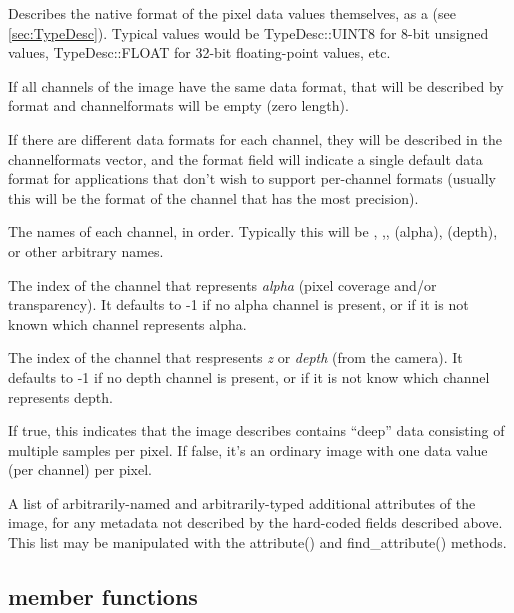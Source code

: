 Describes the native format of the pixel data values themselves, as a
\TypeDesc (see \ref{sec:TypeDesc}).  Typical values would be 
{\cf TypeDesc::UINT8} for 8-bit unsigned values, {\cf TypeDesc::FLOAT}
for 32-bit floating-point values, etc.

If all channels of the image have the same data format, that will
be described by {\cf format} and {\cf channelformats} will be empty
(zero length).

If there are different data formats for each channel, they will be
described in the {\cf channelformats} vector, and the {\cf format} field
will indicate a single default data format for applications that don't
wish to support per-channel formats (usually this will be the format
of the channel that has the most precision).
\apiend

The names of each channel, in order.  Typically this will be ,
,,  (alpha),  (depth), or other arbitrary
names.
\apiend

The index of the channel that represents \emph{alpha} (pixel coverage
and/or transparency).  It defaults to -1 if no alpha channel is present,
or if it is not known which channel represents alpha.
\apiend

The index of the channel that respresents \emph{z} or \emph{depth} (from
the camera).  It defaults to -1 if no depth channel is present, or if it
is not know which channel represents depth.
\apiend

If {\cf true}, this indicates that the image describes contains ``deep''
data consisting of multiple samples per pixel.  If {\cf false}, it's an
ordinary image with one data value (per channel) per pixel.
\apiend

A list of arbitrarily-named and arbitrarily-typed additional attributes
of the image, for any metadata not described by the hard-coded fields
described above.  This list may be manipulated with the {\cf
attribute()} and {\cf find_attribute()} methods.
\apiend

\subsection{\ImageSpec member functions}
\label{sec:ImageSpecMemberFuncs}

